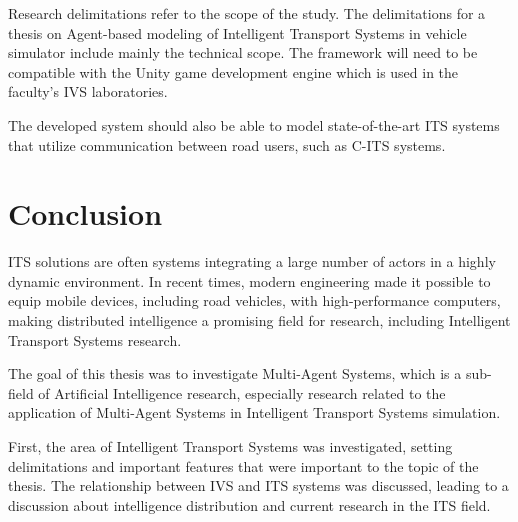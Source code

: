\documentclass[titlepage, 12pt]{article}
\begin{document}
Research delimitations refer to the scope of the study. The delimitations
for a thesis on Agent-based modeling of Intelligent Transport Systems in vehicle simulator include mainly 
the technical scope. The framework will need to be compatible with the Unity game development engine which 
is used in the faculty's IVS laboratories. 

The developed system should also be able to model state-of-the-art ITS systems that utilize communication between 
road users, such as C-ITS systems. 





















\clearpage

\section{Conclusion}

ITS solutions are often systems integrating a large number of 
actors in a highly dynamic environment. In recent times, modern engineering made it possible 
to equip mobile devices, including road vehicles, with high-performance computers, making 
distributed intelligence a promising field for research, including Intelligent Transport Systems 
research.

The goal of this thesis was to investigate Multi-Agent Systems, which is a sub-field of Artificial Intelligence 
research, especially research related to the application of Multi-Agent Systems in Intelligent Transport Systems 
simulation. 

First, the area of Intelligent Transport Systems was investigated, setting delimitations and important features 
that were important to the topic of the thesis. The relationship between IVS and ITS systems was discussed, leading 
to a discussion about intelligence distribution and current research in the ITS field. 
\end{document}
